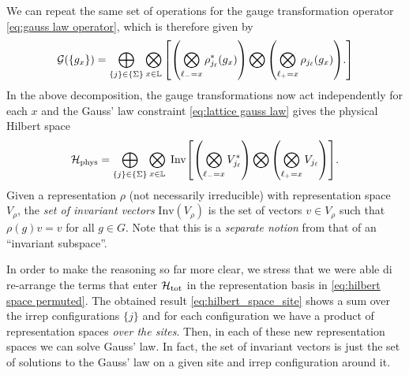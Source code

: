 \begin{figure}[t]
    \centering
\end{figure}


We can repeat the same set of operations for the gauge transformation operator \eqref{eq:gauss law operator}, which is therefore given by
\begin{equation}
    \mathcal{G}(\{g_x\}) =
    \bigoplus_{\{j\} \in \{\Sigma\}} \bigotimes_{x \in \Lattice}
    \bqty{
        \pqty{\bigotimes_{\link_{-}=x} \rho_{j_{\link}}^*(g_x)} \bigotimes
        \pqty{\bigotimes_{\link_{+}=x} \rho_{j_{\link}}(g_x) }.
    }
\end{equation}
In the above decomposition, the gauge transformations now act independently for each $x$ and the Gauss' law constraint \eqref{eq:lattice gauss law} gives the physical Hilbert space
\begin{equation}
    \label{eq:spin network Hilbert space}
    \HilbertPhys =
    \bigoplus_{\{j\} \in \{\Sigma\}} \bigotimes_{x \in \Lattice} \;
    \mathrm{Inv} \bqty{
        \pqty{\bigotimes_{\link_{-}=x} V_{j_{\link}}^*} \bigotimes
        \pqty{\bigotimes_{\link_{+}=x} V_{j_{\link}} }
    }.
\end{equation}
Given a representation $\rho$ (not necessarily irreducible) with representation space $V_\rho$, the \emph{set of invariant vectors} $\mathrm{Inv}(V_\rho)$ is the set of vectors $v \in V_\rho$ such that $\rho(g) v = v$ for all $g\in G$.
Note that this is a \emph{separate notion} from that of an ``invariant subspace''.

In order to make the reasoning so far more clear, we stress that we were able di re-arrange the terms that enter $\mathcal{H}_{\text{tot}}$ in the representation basis in \eqref{eq:hilbert space permuted}.
The obtained result \eqref{eq:hilbert_space_site} shows a sum over the \ac{irrep} configurations $\{j\}$ and for each configuration we have a product of representation spaces \emph{over the sites}.
Then, in each of these new representation spaces we can solve Gauss' law.
In fact, the set of invariant vectors is just the set of solutions to the Gauss' law on a given site and \ac{irrep} configuration around it.

